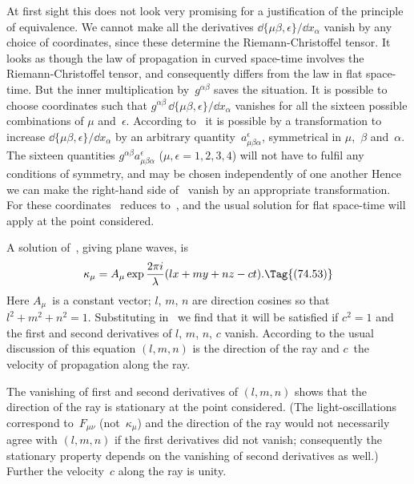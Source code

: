 \documentclass[12pt]{book}
\begin{document}
At first sight this does not look very promising for a justification of the
principle of equivalence. We cannot make all the derivatives $\dd\{\mu\beta, \epsilon\}/\dd x_{\alpha}$
vanish by any choice of coordinates, since these determine the Riemann\hyp{}Christoffel
tensor. It looks as though the law of propagation in curved space-time
involves the Riemann\hyp{}Christoffel tensor, and consequently differs from
the law in flat space-time. But the inner multiplication by~$g^{\alpha\beta}$ saves the
situation. It is possible to choose coordinates such that $g^{\alpha\beta}\, \dd\{\mu\beta, \epsilon\}/\dd x_{\alpha}$ vanishes
for all the sixteen possible combinations of $\mu$ and~$\epsilon$\footnotemark.\footnotetext
  {According to~ it is possible by a transformation to increase $\dd\{\mu\beta, \epsilon\}/\dd x_{\alpha}$ by an
  arbitrary quantity~$a_{\mu\beta\alpha}^{\epsilon}$, symmetrical in $\mu$,~$\beta$ and~$\alpha$. The sixteen quantities $g^{\alpha\beta} a_{\mu\beta\alpha}^{\epsilon}$ ($\mu, \epsilon = 1, 2, 3, 4$)
  will not have to fulfil any conditions of symmetry, and may be chosen independently of one another
  Hence we can make the right-hand side of~ vanish by an appropriate transformation.}
For these coordinates
~reduces to~, and the usual solution for flat space-time will
apply at the point considered.

A solution of~, giving plane waves, is
%
%
\[
\kappa_{\mu} = A_{\mu} \exp\frac{2\pi i}{\lambda}(lx + my + nz - ct).
\Tag{(74.53)}
\]
Here $A_{\mu}$~is a constant vector; $l$, $m$, $n$ are direction cosines so that $l^{2} + m^{2} + n^{2} = 1$.
Substituting in~ we find that it will be satisfied if $c^2 = 1$ and the first
and second derivatives of $l$, $m$, $n$, $c$ vanish. According to the usual discussion
of this equation $(l, m, n)$ is the direction of the ray and $c$~the velocity of
propagation along the ray.

The vanishing of first and second derivatives of $(l, m, n)$ shows that the
direction of the ray is stationary at the point considered. (The light\hyp{}oscillations
correspond to~$F_{\mu\nu}$ (not~$\kappa_{\mu}$) and the direction of the ray would not
necessarily agree with $(l, m, n)$ if the first derivatives did not vanish; consequently
the stationary property depends on the vanishing of second derivatives
as well.) Further the velocity~$c$ along the ray is unity.
\end{document}

